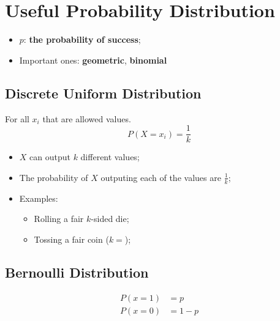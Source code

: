 \chapter{Useful Probability Distribution}

\begin{itemize}
  \item $ p $: \textbf{the probability of success};
  \item Important ones: \textbf{geometric}, \textbf{binomial}
\end{itemize}

\section{Discrete Uniform Distribution}

  For all $ x_{i} $ that are allowed values.
  \begin{equation}
    P \left( X = x_{i} \right) = \frac{1}{k}
  \end{equation} 

  \begin{itemize}
    \item $ X $ can output $ k $ different values;
    \item The probability of $ X $ outputing each of the values are $ \frac{1}{k} $;
    \item Examples:
    \begin{itemize}
      \item Rolling a fair $ k $-sided die;
      \item Tossing a fair coin ($ k = $);
    \end{itemize}
  \end{itemize}
  
\section{Bernoulli Distribution}

  \begin{align}
    P (x = 1) &= p \\
    P(x = 0) &= 1 - p
  \end{align}

